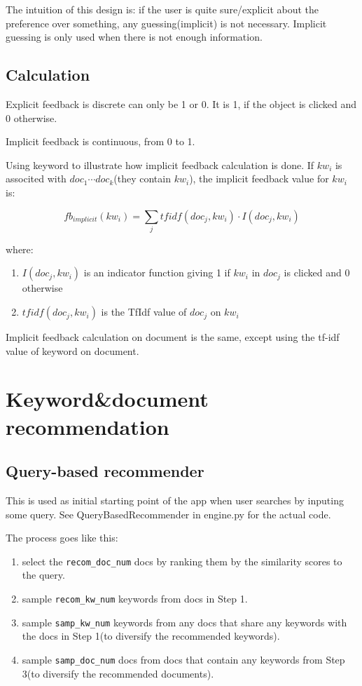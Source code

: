 \documentclass[10pt,a4paper]{article}
\begin{document}
The intuition of this design is: if the user is quite sure/explicit about the preference over something, any guessing(implicit) is not necessary. Implicit guessing is only used when there is not enough information.

\subsection{Calculation}

Explicit feedback is discrete can only be 1 or 0. It is 1, if the object is clicked and 0 otherwise.

Implicit feedback is continuous, from 0 to 1.

Using keyword to illustrate how implicit feedback calculation is done. If $kw_i$ is associted with $doc_1 \cdots doc_k$(they contain $kw_i$), the implicit feedback value for $kw_i$ is:

\begin{equation}
fb_{implicit}(kw_i) = \sum\limits_j{tfidf(doc_j, kw_i) \cdot I(doc_j, kw_i)}
\end{equation}

where:
\begin{enumerate}
\item $I(doc_j, kw_i)$ is an indicator function giving 1 if $kw_i$ in $doc_j$ is clicked and 0 otherwise
\item $tfidf(doc_j, kw_i)$ is the TfIdf value of $doc_j$ on $kw_i$
\end{enumerate}

Implicit feedback calculation on document is the same, except using the tf-idf value of keyword on document.


\section{Keyword\&document recommendation}

\subsection{Query-based recommender}

This is used as initial starting point of the app when user searches by inputing some query. See QueryBasedRecommender in engine.py for the actual code.

The process goes like this:
\begin{enumerate}
\item select the \verb+recom_doc_num+ docs by ranking them by the similarity scores to the query. 
\item sample \verb+recom_kw_num+ keywords from docs in Step 1.
\item sample \verb+samp_kw_num+ keywords from any docs that share any keywords with the docs in Step 1(to diversify the recommended keywords).
\item sample \verb+samp_doc_num+ docs from docs that contain any keywords from Step 3(to diversify the recommended documents).
\end{enumerate}
\end{document}
